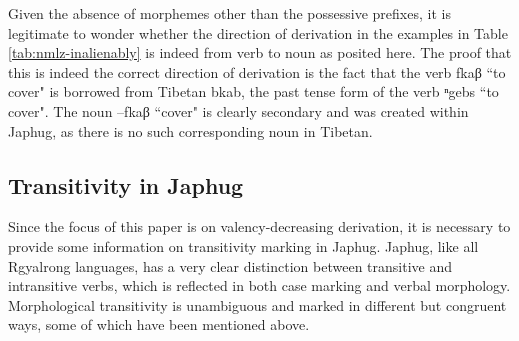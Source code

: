 \documentclass[oldfontcommands,oneside,a4paper,11pt]{article}
\newcommand{\ipa}[1]{{\phon \mbox{#1}}} %
\begin{document}
Given the absence of morphemes other than the possessive prefixes, it is legitimate to wonder whether the direction of derivation in the examples in Table \ref{tab:nmlz-inalienably} is indeed from verb to noun as posited here. The proof that this is indeed the correct direction of derivation is the fact that the verb \ipa{fkaβ} ``to cover" is borrowed from Tibetan \ipa{bkab}, the past tense form of the verb \ipa{ⁿgebs} ``to cover". The noun \ipa{--fkaβ} ``cover" is clearly secondary and was created within Japhug, as there is no such corresponding noun in Tibetan.

%
 
\subsection{Transitivity in Japhug} \label{subsec:trans}
Since the focus of this paper is on valency-decreasing derivation, it is necessary to provide some information on transitivity marking in Japhug. 
Japhug, like all Rgyalrong languages, has a very clear   distinction between transitive and intransitive verbs, which is reflected in both case marking and verbal morphology. Morphological transitivity is unambiguous and  marked in   different but congruent  ways, some of which have been mentioned above.
\end{document}
